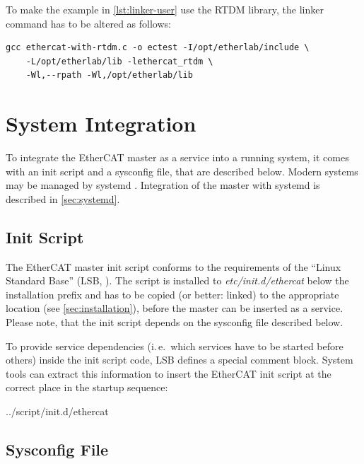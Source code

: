 \documentclass[a4paper,12pt,BCOR=6mm,bibtotoc,idxtotoc]{scrbook}
\begin{document}
To make the example in \autoref{lst:linker-user} use the RTDM library, the
linker command has to be altered as follows:

\begin{lstlisting}
gcc ethercat-with-rtdm.c -o ectest -I/opt/etherlab/include \
    -L/opt/etherlab/lib -lethercat_rtdm \
    -Wl,--rpath -Wl,/opt/etherlab/lib
\end{lstlisting}


\section{System Integration}
\label{sec:system}

To integrate the EtherCAT master as a service into a running system, it comes
with an init script and a sysconfig file, that are described below. Modern
systems may be managed by systemd \cite{systemd}. Integration of the master
with systemd is described in \autoref{sec:systemd}.

\subsection{Init Script}
\label{sec:init}

The EtherCAT master init script conforms to the requirements of the ``Linux
Standard Base'' (LSB, \cite{lsb}). The script is installed to
\textit{etc/init.d/ethercat} below the installation prefix and has to be
copied (or better: linked) to the appropriate location (see
\autoref{sec:installation}), before the master can be inserted as a service.
Please note, that the init script depends on the sysconfig file described
below.

To provide service dependencies (i.\,e.\ which services have to be started
before others) inside the init script code, LSB defines a special comment
block. System tools can extract this information to insert the EtherCAT init
script at the correct place in the startup sequence:


    {../script/init.d/ethercat}

\subsection{Sysconfig File}
\label{sec:sysconfig}
\end{document}
